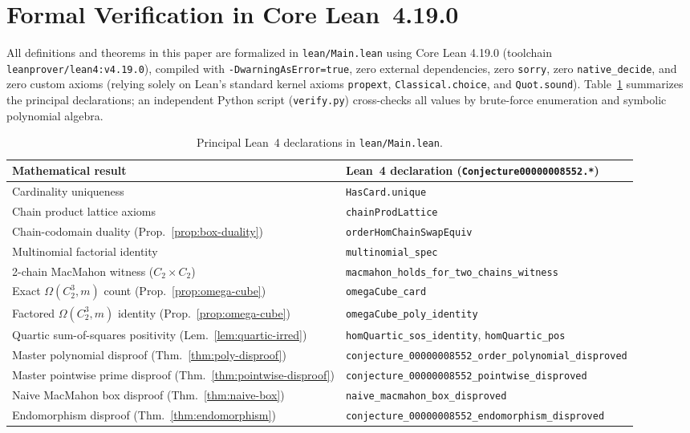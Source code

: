 \documentclass[11pt,a4paper]{article}
\theoremstyle{definition}
\begin{document}
\section{Formal Verification in Core Lean~4.19.0}

All definitions and theorems in this paper are formalized in \texttt{lean/\allowbreak Main.lean}
using Core Lean 4.19.0 (toolchain \texttt{leanprover/\allowbreak lean4:\allowbreak v4.19.0}),
compiled with \texttt{-Dwarning\allowbreak AsError=\allowbreak true}, zero external dependencies,
zero \texttt{sorry}, zero \texttt{native\_decide}, and zero custom axioms (relying solely on Lean's
standard kernel axioms \texttt{propext}, \texttt{Classical.\allowbreak choice}, and
\texttt{Quot.sound}). Table~\ref{tab:lean-map} summarizes the principal declarations; an independent
Python script (\texttt{verify.py}) cross-checks all values by brute-force enumeration and symbolic
polynomial algebra.

\begin{table}[ht]
\centering
\caption{Principal Lean~4 declarations in \texttt{lean/Main.lean}.}\label{tab:lean-map}
\smallskip
{\footnotesize
\begin{tabular}{@{}ll@{}}
\toprule
Mathematical result & Lean~4 declaration (\texttt{Conjecture00000008552.*}) \\
\midrule
Cardinality uniqueness & \texttt{HasCard.unique} \\
Chain product lattice axioms & \texttt{chainProdLattice} \\
Chain-codomain duality (Prop.~\ref{prop:box-duality}) & \texttt{orderHomChainSwapEquiv} \\
Multinomial factorial identity & \texttt{multinomial\_spec} \\
2-chain MacMahon witness ($C_2 \times C_2$) & \texttt{macmahon\_holds\_for\_two\_chains\_witness} \\
Exact $\Omega(C_2^3, m)$ count (Prop.~\ref{prop:omega-cube}) & \texttt{omegaCube\_card} \\
Factored $\Omega(C_2^3, m)$ identity (Prop.~\ref{prop:omega-cube}) & \texttt{omegaCube\_poly\_identity} \\
Quartic sum-of-squares positivity (Lem.~\ref{lem:quartic-irred}) & \texttt{homQuartic\_sos\_identity}, \texttt{homQuartic\_pos} \\
Master polynomial disproof (Thm.~\ref{thm:poly-disproof}) & \texttt{conjecture\_00000008552\_order\_polynomial\_disproved} \\
Master pointwise prime disproof (Thm.~\ref{thm:pointwise-disproof}) & \texttt{conjecture\_00000008552\_pointwise\_disproved} \\
Naive MacMahon box disproof (Thm.~\ref{thm:naive-box}) & \texttt{naive\_macmahon\_box\_disproved} \\
Endomorphism disproof (Thm.~\ref{thm:endomorphism}) & \texttt{conjecture\_00000008552\_endomorphism\_disproved} \\
\bottomrule
\end{tabular}}
\end{table}
\end{document}
